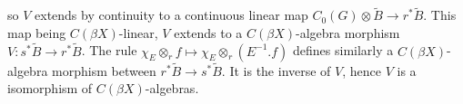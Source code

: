 \begin{dem}
so $V$ extends by continuity to a continuous linear map $ C_0(G)\otimes\tilde B \rightarrow r^* \tilde B$. This map being $C(\beta X)$-linear, $V$ extends to a $C(\beta X)$-algebra morphism $V :s^*\tilde B \rightarrow r^* \tilde B$. The rule $\chi_E \otimes_r f\mapsto \chi_E \otimes_r (E^{-1}.f)$ defines similarly a $C(\beta X)$-algebra morphism between $r^*\tilde B \rightarrow s^*\tilde B$. It is the inverse of $V$, hence $V$ is a isomorphism of $C(\beta X)$-algebras.\\


\end{dem}
